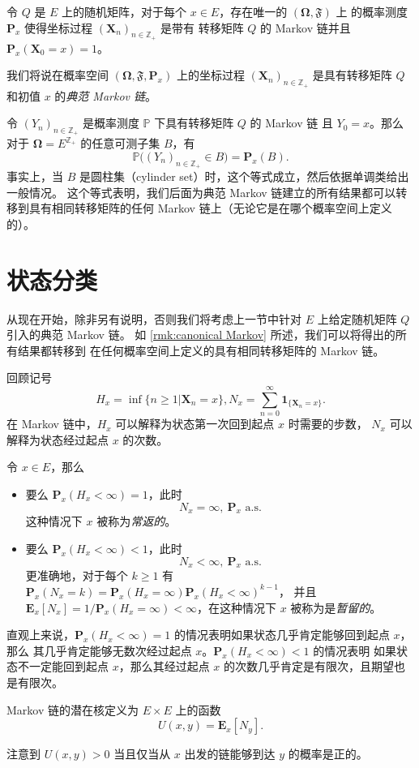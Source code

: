 \documentclass[fontset=none]{Notes}
\newcommand{\mat}[1]{\mathbold{#1}}
\newcommand{\matup}[1]{\mathbf{#1}}
\newcommand{\indicator}[1]{\mathbold 1_{#1}}
\newcommand{\alsu}[1]{\text{$#1$ a.s.}}
\begin{document}
\begin{theorem}
  令 $Q$ 是 $E$ 上的随机矩阵，对于每个 $x\in E$，存在唯一的 $(\mat\Omega,\mathfrak F)$ 上
  的概率测度 $\matup P_x$ 使得坐标过程 $(\mat X_n)_{n\in \mathbb{Z}_+}$ 是带有
  转移矩阵 $Q$ 的 Markov 链并且 $\matup P_x(\mat X_0=x)=1$。
\end{theorem}
\begin{remark}
  我们将说在概率空间 $(\mat\Omega,\mathfrak F,\matup P_x)$ 上的坐标过程
  $(\mat X_n)_{n\in \mathbb{Z}_+}$ 是具有转移矩阵 $Q$ 和初值 $x$ 的\emph{典范 Markov 链}。
\end{remark}

\begin{remark}\label{rmk:canonical Markov}
  令 $(Y_n)_{n\in \mathbb{Z}_+}$ 是概率测度 $\mathbb{P}$ 下具有转移矩阵 $Q$ 的 Markov 链
  且 $Y_0=x$。那么对于 $\mat\Omega=E^{\mathbb{Z}_+}$ 的任意可测子集 $B$，有
  \[
    \mathbb{P}\bigl((Y_n)_{n\in \mathbb{Z}_+}\in B\bigr)=\matup P_x(B).
  \]
  事实上，当 $B$ 是圆柱集（cylinder set）时，这个等式成立，然后依据单调类给出一般情况。
  这个等式表明，我们后面为典范 Markov 链建立的所有结果都可以转移到具有相同转移矩阵的任何
  Markov 链上（无论它是在哪个概率空间上定义的）。
\end{remark}

\section{状态分类}

从现在开始，除非另有说明，否则我们将考虑上一节中针对 $E$ 上给定随机矩阵 $Q$ 引入的典范 Markov 链。
如 \autoref{rmk:canonical Markov} 所述，我们可以将得出的所有结果都转移到
在任何概率空间上定义的具有相同转移矩阵的 Markov 链。

回顾记号
\[
  H_x=\inf\{n\geq 1| \mat X_n=x\}, N_x=\sum_{n=0}^\infty \indicator{\{\mat X_n=x\}}.
\]
在 Markov 链中，$H_x$ 可以解释为状态第一次回到起点 $x$ 时需要的步数，
$N_x$ 可以解释为状态经过起点 $x$ 的次数。

\begin{proposition}
  令 $x\in E$，那么
  \begin{itemize}
    \item 要么 $\matup P_x(H_x<\infty)=1$，此时
    \[
      N_x=\infty,\ \alsu{\matup P_x}
    \]
    这种情况下 $x$ 被称为\emph{常返的}。
    \item 要么 $\matup P_x(H_x<\infty)<1$，此时
    \[
      N_x<\infty,\ \alsu{\matup P_x}
    \]
    更准确地，对于每个 $k\geq 1$ 有 $\matup P_x(N_x=k)=\matup P_x(H_x=\infty)\matup P_x(H_x<\infty)^{k-1}$，
    并且 $\matup E_x[N_x]=1/\matup P_x(H_x=\infty)<\infty$，在这种情况下 $x$
    被称为是\emph{暂留的}。
  \end{itemize}
\end{proposition}
\begin{remark}
  直观上来说，$\matup P_x(H_x<\infty)=1$ 的情况表明如果状态几乎肯定能够回到起点 $x$，那么
  其几乎肯定能够无数次经过起点 $x$。$\matup P_x(H_x<\infty)<1$ 的情况表明
  如果状态不一定能回到起点 $x$，那么其经过起点 $x$ 的次数几乎肯定是有限次，且期望也是有限次。
\end{remark}

\begin{definition}
  Markov 链的潜在核定义为 $E\times E$ 上的函数 
  \[
    U(x,y)=\matup E_x[N_y].
  \]
\end{definition}

注意到 $U(x,y)>0$ 当且仅当从 $x$ 出发的链能够到达 $y$ 的概率是正的。
\end{document}
